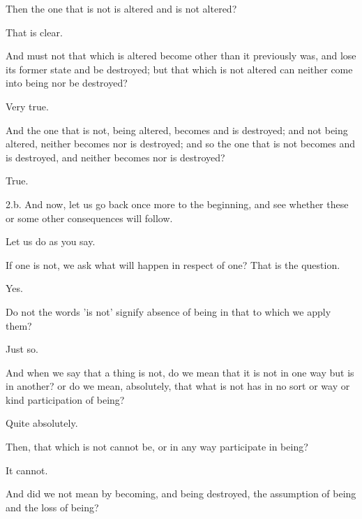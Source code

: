 \documentclass[11pt,letter]{article}
\begin{document}
\par  Then the one that is not is altered and is not altered?

\par  That is clear.

\par  And must not that which is altered become other than it previously was, and lose its former state and be destroyed; but that which is not altered can neither come into being nor be destroyed?

\par  Very true.

\par  And the one that is not, being altered, becomes and is destroyed; and not being altered, neither becomes nor is destroyed; and so the one that is not becomes and is destroyed, and neither becomes nor is destroyed?

\par  True.

\par  2.b. And now, let us go back once more to the beginning, and see whether these or some other consequences will follow.

\par  Let us do as you say.

\par  If one is not, we ask what will happen in respect of one? That is the question.

\par  Yes.

\par  Do not the words 'is not' signify absence of being in that to which we apply them?

\par  Just so.

\par  And when we say that a thing is not, do we mean that it is not in one way but is in another? or do we mean, absolutely, that what is not has in no sort or way or kind participation of being?

\par  Quite absolutely.

\par  Then, that which is not cannot be, or in any way participate in being?

\par  It cannot.

\par  And did we not mean by becoming, and being destroyed, the assumption of being and the loss of being?
\end{document}
